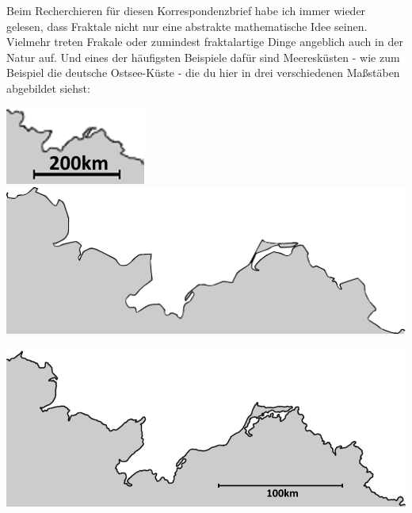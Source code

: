 \documentclass[a4paper,ngerman,12pt]{scrartcl}
\theoremstyle{definition}
\theoremstyle{plain}
\theoremstyle{remark}
\begin{document}
Beim Recherchieren für diesen Korrespondenzbrief habe ich immer wieder gelesen, dass Fraktale nicht nur eine abstrakte mathematische Idee seinen. Vielmehr treten Frakale oder zumindest fraktalartige Dinge angeblich auch in der Natur auf. Und eines der häufigsten Beispiele dafür sind Meeresküsten - wie zum Beispiel die deutsche Ostsee-Küste - die du hier in drei verschiedenen Maßstäben abgebildet siehst:

\includegraphics[width=.1\textwidth]{Bilder/Ostsee1.png}
\includegraphics[width=.5\textwidth]{Bilder/Ostsee2.pdf}

\includegraphics[width=.9\textwidth]{Bilder/Ostsee3.png}
\end{document}
